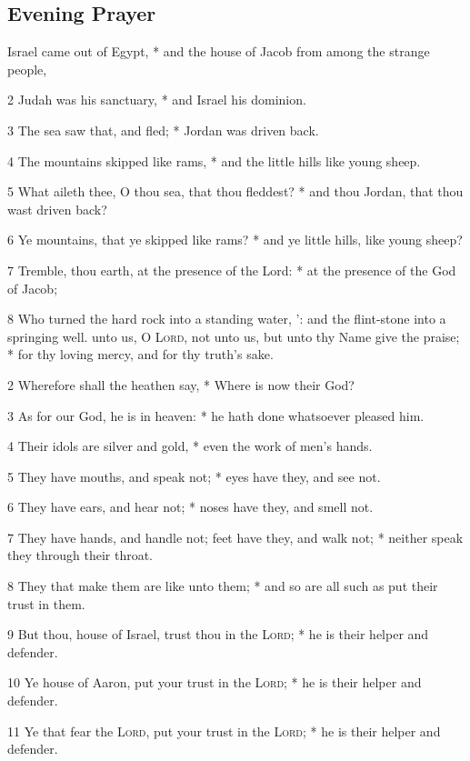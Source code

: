 \subsection{Evening Prayer}
 Israel came out of Egypt, * and the house of Jacob from among the strange people,\par
2 Judah was his sanctuary, * and Israel his dominion.\par
3 The sea saw that, and fled; * Jordan was driven back.\par
4 The mountains skipped like rams, * and the little hills like young sheep.\par
5 What aileth thee, O thou sea, that thou fleddest? * and thou Jordan, that thou wast driven back?\par
6 Ye mountains, that ye skipped like rams? * and ye little hills, like young sheep?\par
7 Tremble, thou earth, at the presence of the Lord: * at the presence of the God of Jacob;\par
8 Who turned the hard rock into a standing water, ': and the flint-stone into a springing well.
 unto us, O {\textsc{Lord}}, not unto us, but unto thy Name give the praise; * for thy loving mercy, and for thy truth's sake.\par
2 Wherefore shall the heathen say, * Where is now their God?\par
3 As for our God, he is in heaven: * he hath done whatsoever pleased him.\par
4 Their idols are silver and gold, * even the work of men's hands.\par
5 They have mouths, and speak not; * eyes have they, and see not.\par
6 They have ears, and hear not; * noses have they, and smell not.\par
7 They have hands, and handle not; feet have they, and walk not; * neither speak they through their throat.\par
8 They that make them are like unto them; * and so are all such as put their trust in them.\par
9 But thou, house of Israel, trust thou in the {\textsc{Lord}}; * he is their helper and defender.\par
10 Ye house of Aaron, put your trust in the {\textsc{Lord}}; * he is their helper and defender.\par
11 Ye that fear the {\textsc{Lord}}, put your trust in the {\textsc{Lord}}; * he is their helper and defender.\par
